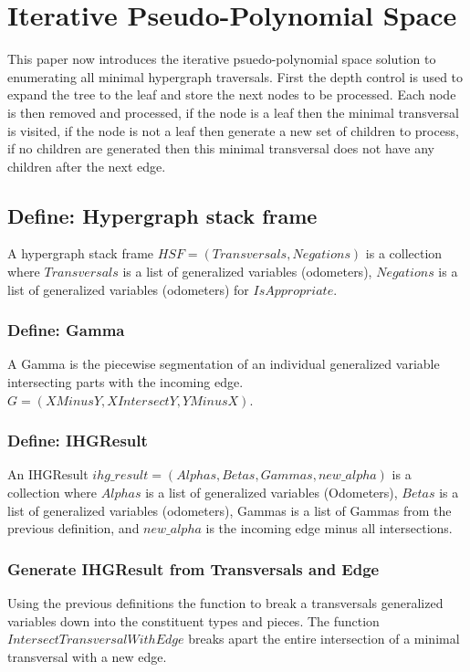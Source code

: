 \chapter{Iterative Pseudo-Polynomial Space}

This paper now introduces the iterative psuedo-polynomial space solution to enumerating all minimal hypergraph traversals. First the depth control is used to expand the tree to the leaf and store the next nodes to be processed. Each node is then removed and processed, if the node is a leaf then the minimal transversal is visited, if the node is not a leaf then generate a new set of children to process, if no children are generated then this minimal transversal does not have any children after the next edge. 

\section{Define: Hypergraph stack frame}
A hypergraph stack frame $HSF = (Transversals,Negations)$ is a collection where $Transversals$ is a list of generalized variables (odometers), $Negations$ is a list of generalized variables (odometers) for $IsAppropriate$.


\subsection{Define: Gamma}
A Gamma is the piecewise segmentation of an individual generalized variable intersecting parts with the incoming edge. $G = (XMinusY, XIntersectY, YMinusX)$.

\subsection{Define: IHGResult }
An IHGResult $ihg\_result = (Alphas,Betas,Gammas,new\_alpha)$ is a collection where $Alphas$ is a list of generalized variables (Odometers), $Betas$ is a list of generalized variables (odometers), Gammas is a list of Gammas from the previous definition, and $new\_alpha$ is the incoming edge minus all intersections.

\subsection{Generate IHGResult from Transversals and Edge}
Using the previous definitions the function to break a transversals generalized variables down into the constituent types and pieces. The function $IntersectTransversalWithEdge$ breaks apart the entire intersection of a minimal transversal with a new edge. 

